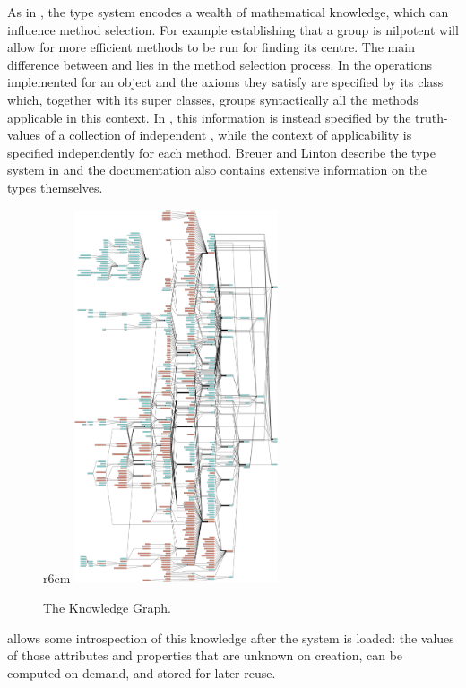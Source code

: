 As in \Sage, the \GAP type system encodes a wealth of mathematical
knowledge, which can influence method selection. For example
establishing that a group is nilpotent will allow for more efficient
methods to be run for finding its centre. The main difference between \Sage
and \GAP lies in the method selection process. In \Sage the operations
implemented for an object and the axioms they satisfy are specified by
its class which, together with its super classes, groups syntactically
all the methods applicable in this context. In \GAP, this information
is instead specified by the truth-values of a collection of
independent , while the context of applicability is
specified independently for each method.
%
Breuer and Linton describe the \GAP type system in \cite{breuer-linton} and
the \GAP documentation \cite{GAP4} also contains extensive information on the types
themselves.

\begin{figure}r{6cm}%
  \includegraphics[natwidth=5246bp,natheight=9631bp,width=6cm]{gap-graph.pdf}\vspace*{-.5em}
  \caption{The \GAP Knowledge Graph.\label{fig:gap-graph}}\vspace*{-2em}
\end{figure}
\GAP allows some introspection of this knowledge after the system is
loaded: the values of those attributes and properties that are unknown on creation,
can be computed on demand, and stored for later reuse.%

